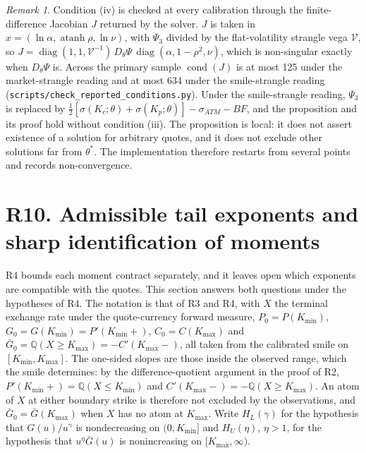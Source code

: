 \documentclass[11pt]{article}
\theoremstyle{remark}
\newtheorem{remark}[proposition]{Remark}
\newcommand{\Q}{\mathbb{Q}}
\begin{document}
\begin{remark}
Condition (iv) is checked at every calibration through the finite-difference Jacobian $J$ returned by the solver. $J$ is taken in $x=(\ln\alpha,\operatorname{atanh}\rho,\ln\nu)$, with $\Psi_3$ divided by the flat-volatility strangle vega $\mathcal V$, so $J=\operatorname{diag}(1,1,\mathcal V^{-1})\,D_\theta\Psi\,\operatorname{diag}(\alpha,1-\rho^2,\nu)$, which is non-singular exactly when $D_\theta\Psi$ is. Across the primary sample $\operatorname{cond}(J)$ is at most 125 under the market-strangle reading and at most 634 under the smile-strangle reading (\texttt{scripts/check\_reported\_conditions.py}). Under the smile-strangle reading, $\Psi_3$ is replaced by $\tfrac12[\sigma(K_c;\theta)+\sigma(K_p;\theta)]-\sigma_{ATM}-BF$, and the proposition and its proof hold without condition (iii). The proposition is local: it does not assert existence of a solution for arbitrary quotes, and it does not exclude other solutions far from $\theta^*$. The implementation therefore restarts from several points and records non-convergence.
\end{remark}

\section*{R10. Admissible tail exponents and sharp identification of moments}

R4 bounds each moment contract separately, and it leaves open which exponents are compatible with the quotes. This section answers both questions under the hypotheses of R4. The notation is that of R3 and R4, with $X$ the terminal exchange rate under the quote-currency forward measure, $P_0=P(K_{\min})$, $G_0=G(K_{\min})=P'(K_{\min}+)$, $C_0=C(K_{\max})$ and $\bar G_0=\Q(X\ge K_{\max})=-C'(K_{\max}-)$, all taken from the calibrated smile on $[K_{\min},K_{\max}]$. The one-sided slopes are those inside the observed range, which the smile determines: by the difference-quotient argument in the proof of R2, $P'(K_{\min}+)=\Q(X\le K_{\min})$ and $C'(K_{\max}-)=-\Q(X\ge K_{\max})$. An atom of $X$ at either boundary strike is therefore not excluded by the observations, and $\bar G_0=\bar G(K_{\max})$ when $X$ has no atom at $K_{\max}$. Write $H_L(\gamma)$ for the hypothesis that $G(u)/u^\gamma$ is nondecreasing on $(0,K_{\min}]$ and $H_U(\eta)$, $\eta>1$, for the hypothesis that $u^\eta\bar G(u)$ is nonincreasing on $[K_{\max},\infty)$.
\end{document}
